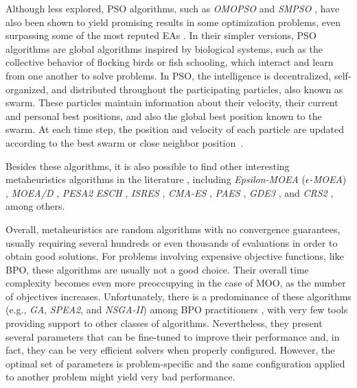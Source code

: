 	Although less explored, \ac{PSO} algorithms, such as \textit{OMOPSO} and \textit{SMPSO} \cite{Sierra2005OMOPSO,SMPSO}, have also been shown to yield promising results in some optimization problems, even surpassing some of the most reputed \acp{EA} \cite{Durillo2011SMPSO}. In their simpler versions, \ac{PSO} algorithms are global algorithms inspired by biological systems, such as the collective behavior of flocking birds or fish schooling, which interact and learn from one another to solve problems. In \ac{PSO}, the intelligence is decentralized, self-organized, and distributed throughout the participating particles, also known as swarm. These particles maintain information about their velocity, their current and personal best positions, and also the global best position known to the swarm. At each time step, the position and velocity of each particle are updated according to the best swarm or close neighbor position~\cite{Brownlee2011}.
	
	Besides these algorithms, it is also possible to find other interesting metaheuristics algorithms in the literature \cite{Zavala2014, Wortmann2017GABESTCHOICE}, including \textit{Epsilon-\ac{MOEA}} ($\epsilon$\textit{-\ac{MOEA}}) \cite{Deb2003EpsMOEA}, \textit{\ac{MOEA}/D} \cite{Zhang2007MOEAD}, \textit{PESA2} \cite{Corne2001} \textit{ESCH} \cite{Santos2010}, \textit{ISRES} \cite{Runarsson2000}, \textit{CMA-ES} \cite{Hansen2006}, \textit{PAES} \cite{Knowles1999}, \textit{GDE3} \cite{GDE3}, and \textit{CRS2} \cite{Kaelo2006CRS2}, among others.
	
	Overall, metaheuristics are random algorithms with no convergence guarantees, usually requiring several hundreds or even thousands of evaluations in order to obtain good solutions. For problems involving expensive objective functions, like \ac{BPO}, these algorithms are usually not a good choice. Their overall time complexity becomes even more preoccupying in the case of \ac{MOO}, as the number of objectives increases. Unfortunately, there is a predominance of these algorithms (e.g., \textit{\ac{GA}}, \textit{\ac{SPEA2}}, and \textit{\ac{NSGA-II}}) among \ac{BPO} practitioners \cite{Wortmann2017GABESTCHOICE}, with very few tools providing support to other classes of algorithms. Nevertheless, they present several parameters that can be fine-tuned to improve their performance and, in fact, they can be very efficient solvers when properly configured. However, the optimal set of parameters is problem-specific and the same configuration applied to another problem might yield very bad performance.
	
